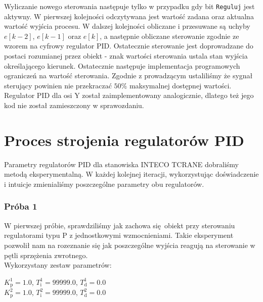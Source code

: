 \vspace{0.5cm}
\indent{} Wyliczanie nowego sterowania następuje tylko w przypadku gdy bit \texttt{Reguluj} jest aktywny.
W pierwszej kolejności odczytywana jest wartość zadana oraz aktualna wartość wyjścia procesu.
W dalszej kolejności obliczane i przesuwane są uchyby $e[k-2]$, $e[k-1]$ oraz $e[k]$, a następnie 
obliczane sterowanie zgodnie ze wzorem na cyfrowy regulator PID. Ostatecznie sterowanie jest doprowadzane 
do postaci rozumianej przez obiekt - znak wartości sterowania ustala stan wyjścia określającego kierunek.
Ostatecznie następuje implementacja programowych ograniczeń na wartość sterowania. Zgodnie z prowadzącym
ustaliliśmy że sygnał sterujący powinien nie przekraczać $50$\% maksymalnej dostępnej wartości. \\

Regulator PID dla osi Y został zaimplementowany analogicznie, dlatego też jego kod nie został zamieszczony
w sprawozdaniu.









\newpage
\section{Proces strojenia regulatorów PID}
\label{inteco_strojenie_pid}
Parametry regulatorów PID dla stanowiska INTECO TCRANE dobraliśmy metodą eksperymentalną.
W każdej kolejnej iteracji, wykorzystując doświadczenie i intuicje zmienialiśmy poszczególne
parametry obu regulatorów.\\


\subsubsection{Próba 1}
W pierwszej próbie, sprawdziliśmy jak zachowa się obiekt przy sterowaniu regulatorami
typu P z jednostkowymi wzmocnieniami. Takie eksperyment pozwolił nam na rozeznanie się
jak poszczególne wyjścia reagują na sterowanie w pętli sprzężenia zwrotnego.\\

Wykorzystany zestaw parametrów:

\begin{center}
    $K^{\num{1}}_{\mathrm{p}} = \num{1.0}$, $T^{\num{1}}_{\mathrm{i}} = \num{99999.0}$, $T^{\num{1}}_{\mathrm{d}} = \num{0.0}$ \\
    $K^{\num{2}}_{\mathrm{p}} = \num{1.0}$, $T^{\num{2}}_{\mathrm{i}} = \num{99999.0}$, $T^{\num{2}}_{\mathrm{d}} = \num{0.0}$ \\
\end{center}
\vspace{1cm}

